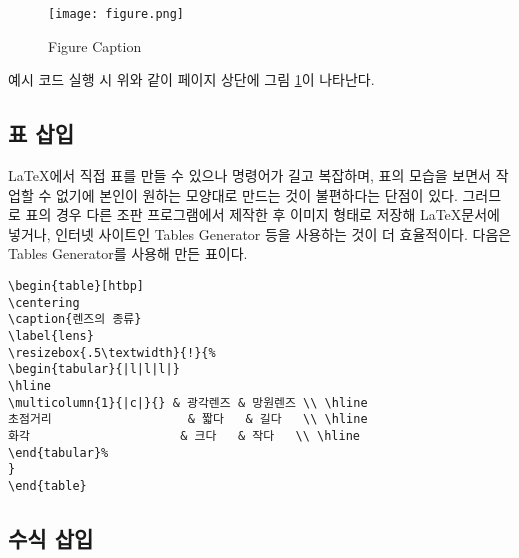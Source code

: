 \newpage

\begin{figure}[t]
	\begin{center}
		\texttt{[image: figure.png]}
		\caption{Figure Caption}
		\label{figlabel}
	\end{center}
\end{figure}

\noindent 예시 코드 실행 시 위와 같이 페이지 상단에 그림 \ref{figlabel}이 나타난다.

\subsection{표 삽입}

\LaTeX 에서 직접 표를 만들 수 있으나 명령어가 길고 복잡하며, 표의 모습을 보면서 작업할 수 없기에 본인이 원하는 모양대로 만드는 것이 불편하다는 단점이 있다.
그러므로 표의 경우 다른 조판 프로그램에서 제작한 후 이미지 형태로 저장해 \LaTeX 문서에 넣거나, 인터넷 사이트인 Tables Generator 등을 사용하는 것이 더 효율적이다. 다음은 Tables Generator를 사용해 만든 표이다.
\begin{lstlisting}
\begin{table}[htbp]
\centering
\caption{렌즈의 종류}
\label{lens}
\resizebox{.5\textwidth}{!}{%
\begin{tabular}{|l|l|l|}
\hline
\multicolumn{1}{|c|}{} & 광각렌즈 & 망원렌즈 \\ \hline
초점거리                   & 짧다   & 길다   \\ \hline
화각                     & 크다   & 작다   \\ \hline
\end{tabular}%
}
\end{table}
\end{lstlisting}

\begin{table}[htbp]
	\centering
	\caption{렌즈의 종류}
	\label{lens}
\end{table}

\subsection{수식 삽입}

